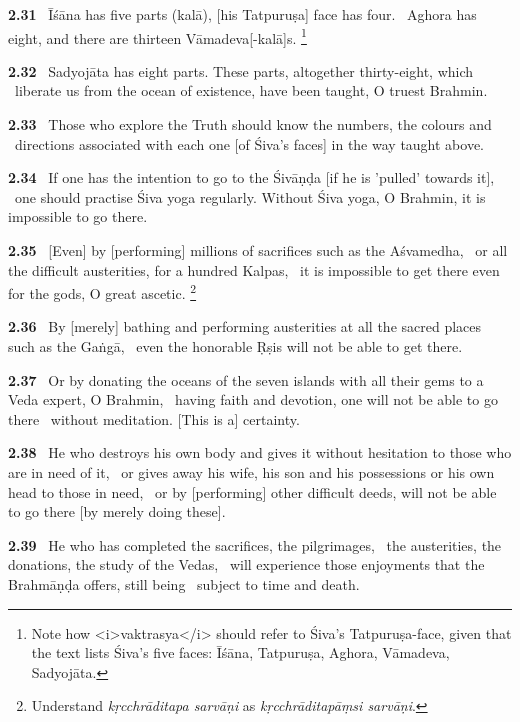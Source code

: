 \documentclass{article}
\newcommand{\skt}[1]{\textit{#1}}
\begin{document}
\textbf{2.31}%
\ Īśāna has five parts (kalā), [his Tatpuruṣa] face has four.%
\              Aghora has eight, and there are thirteen Vāmadeva[-kalā]s.%
\footnote{Note how <i>vaktrasya</i> should refer to Śiva's Tatpuruṣa-face,                 given that the text lists Śiva's five faces: Īśāna, Tatpuruṣa, Aghora, Vāmadeva, Sadyojāta. }%


\textbf{2.32}%
\ Sadyojāta has eight parts. These parts, altogether thirty-eight, which%
\              liberate us from the ocean of existence, have been taught, O truest Brahmin.%


\textbf{2.33}%
\ Those who explore the Truth should know the numbers, the colours and%
\              directions associated with each one [of Śiva's faces] in the way taught above.%


\textbf{2.34}%
\ If one has the intention to go to the Śivāṇḍa [if he is 'pulled' towards it],%
\              one should practise Śiva yoga regularly. Without Śiva yoga, O Brahmin, it is impossible to go there.%


\textbf{2.35}%
\ [Even] by [performing] millions of sacrifices such as the Aśvamedha,%
\              or all the difficult austerities, for a hundred Kalpas,%
\               it is impossible to get there even for the gods, O great ascetic.%
\footnote{Understand \skt{kṛcchrāditapa sarvāṇi} as \skt{kṛcchrāditapāṃsi sarvāṇi}. }%


\textbf{2.36}%
\ By [merely] bathing and performing austerities at all the sacred places such as the Gaṅgā,%
\               even the honorable Ṛṣis will not be able to get there.%


\textbf{2.37}%
\ Or by donating the oceans of the seven islands with all their gems to a Veda expert, O Brahmin,%
\              having faith and devotion, one will not be able to go there%
\              without meditation. [This is a] certainty.%


\textbf{2.38}%
\ He who destroys his own body and gives it without hesitation to those who are in need of it,%
\ or gives away his wife, his son and his possessions or his own head to those in need,%
\ or by [performing] other difficult deeds, will not be able to go there [by merely doing these].%


\textbf{2.39}%
\ He who has completed the sacrifices, the pilgrimages,%
\              the austerities, the donations, the study of the Vedas,%
\ will experience those enjoyments that the Brahmāṇḍa offers, still being%
\                              subject to time and death.%
\end{document}
